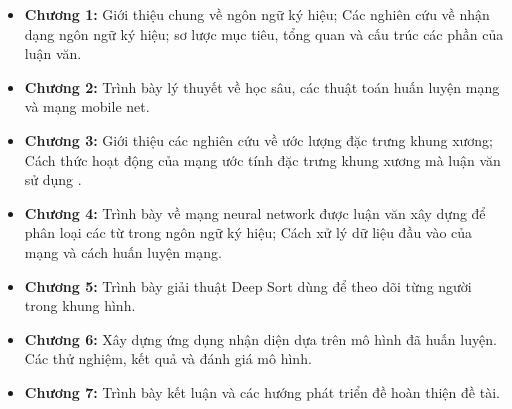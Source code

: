 \begin{itemize}
\item \textbf{Chương 1:}  Giới thiệu chung về ngôn ngữ ký hiệu; Các nghiên cứu về nhận dạng ngôn ngữ ký hiệu; sơ lược mục tiêu, tổng quan và cấu trúc các phần của luận văn.
\item \textbf{Chương 2:} Trình bày lý thuyết về học sâu, các thuật toán huấn luyện mạng và mạng mobile net.
\item \textbf{Chương 3:} Giới thiệu các nghiên cứu về ước lượng đặc trưng khung xương; Cách thức hoạt động của mạng ước tính đặc trưng khung xương mà luận văn sử dụng .
\item \textbf{Chương 4:} Trình bày về mạng neural network được luận văn xây dựng để phân loại các từ trong ngôn ngữ ký hiệu; Cách xử lý dữ liệu đầu vào của mạng và cách huấn luyện mạng.
\item \textbf{Chương 5:} Trình bày giải thuật Deep Sort dùng để theo dõi từng người trong khung hình.

\item \textbf{Chương 6:} Xây dựng ứng dụng nhận diện dựa trên mô hình đã huấn luyện. Các thử nghiệm, kết quả và đánh giá mô hình.

\item \textbf{Chương 7:} Trình bày kết luận và các hướng phát triển đề hoàn thiện đề tài.
\end{itemize}